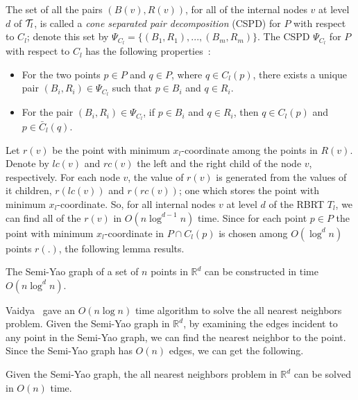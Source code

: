 \documentclass[11pt]{llncs}
\begin{document}
The set of all the pairs $(B(v),R(v))$, for all of the internal nodes $v$ at level $d$ of ${\cal T}_l$, is called a \textit{cone separated pair decomposition} (CSPD) for $P$ with respect to $C_l$; denote this set by $\Psi_{{C}_l}=\{(B_1,R_1),...,(B_m,R_m)\}$. The CSPD $\Psi_{{C}_l}$ for $P$ with respect to $C_l$ has the following properties~\cite{Abam:2011:KSX:1971362.1971367}:
\begin{itemize}
\item For the two points $p\in P$ and $q\in P$, where $q\in C_l(p)$, there exists a unique pair $(B_i,R_i)\in \Psi_{{C}_l}$ such that $p\in B_i$ and $q\in R_i$.
\item For the pair $(B_i,R_i)\in \Psi_{{C}_l}$, if $p\in B_i$ and $q\in R_i$, then $q\in C_l(p)$ and $p\in \bar{C}_l(q)$.
\end{itemize}
Let $r(v)$ be the point with minimum $x_l$-coordinate among the points in $R(v)$. Denote by $lc(v)$ and $rc(v)$ the left and the right child of the node $v$, respectively.  For each node $v$, the value of $r(v)$ is generated from the values of it children, $r(lc(v))$ and $r(rc(v))$; one which stores the point with minimum $x_l$-coordinate. So, for all internal nodes $v$ at level $d$ of the RBRT $T_l$, we can find all of the $r(v)$ in $O(n\log^{d-1} n)$ time. Since for each point $p\in P$ the point with minimum $x_l$-coordinate in $P\cap C_l(p)$ is chosen among $O(\log^d n)$ points $r(.)$, the following lemma results.
\begin{lemma}\label{the:SYConstructionTime}
The Semi-Yao graph of a set of $n$ points in $\mathbb{R}^d$ can be constructed in time $O(n\log^d n)$.
\end{lemma}
Vaidya~\cite{Vaidya:1989:ONL:70530.70532} gave an $O(n\log n)$ time algorithm to solve the all nearest neighbors problem. Given the Semi-Yao graph in $\mathbb{R}^d$, by examining the edges incident to any point in the Semi-Yao graph, we can find the nearest neighbor to the point. Since the Semi-Yao graph has $O(n)$ edges, we can get the following.
\begin{lemma}\label{the:ANNConstructionTime}
Given the Semi-Yao graph, the all nearest neighbors problem in $\mathbb{R}^d$ can be solved in $O(n)$ time.
\end{lemma}
\end{document}

